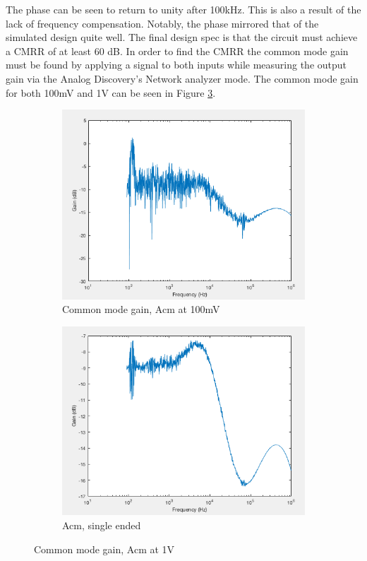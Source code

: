 The phase can be seen to return to unity after 100kHz. This is also a result of the lack of frequency compensation. Notably, the phase mirrored that of the simulated design quite well. The final design spec is that the circuit must achieve a CMRR of at least 60 dB. In order to find the CMRR the common mode gain must be found by applying a signal to both inputs while measuring the output gain via the Analog Discovery's Network analyzer mode. The common mode gain for both 100mV and 1V can be seen in Figure \ref{fig:acmexp}.


\begin{figure}[H]
	\centering
	\begin{subfigure}[b]{0.45\textwidth}
		\centering
		\includegraphics[width=\textwidth]{ExperimentalImplementation/Acm_100mv.png}
		\caption{Common mode gain, Acm at 100mV}
		\label{fig:blue_led}
	\end{subfigure}
	\hfill
	\begin{subfigure}[b]{0.45\textwidth}
		\centering
		\includegraphics[width=\textwidth]{ExperimentalImplementation/Acm_1v.png}
		\caption{Acm, single ended}
		\label{fig:blue_led}
	\end{subfigure}
	\caption{Common mode gain, Acm at 1V}
	\label{fig:acmexp}
\end{figure} 

